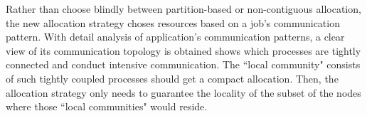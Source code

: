 \documentclass[conference]{IEEEtran}
\begin{document}
%
%
%


Rather than choose blindly between partition-based or non-contiguous allocation, the new allocation strategy choses resources based on a job's communication pattern. With detail analysis of application's communication patterns, a clear view of its communication topology is obtained shows which processes are tightly connected and conduct intensive communication. The ``local community" consists of such tightly coupled processes should get a compact allocation. Then, the allocation strategy only needs to guarantee the locality of the subset of the nodes where those ``local communities" would reside.
\end{document}
